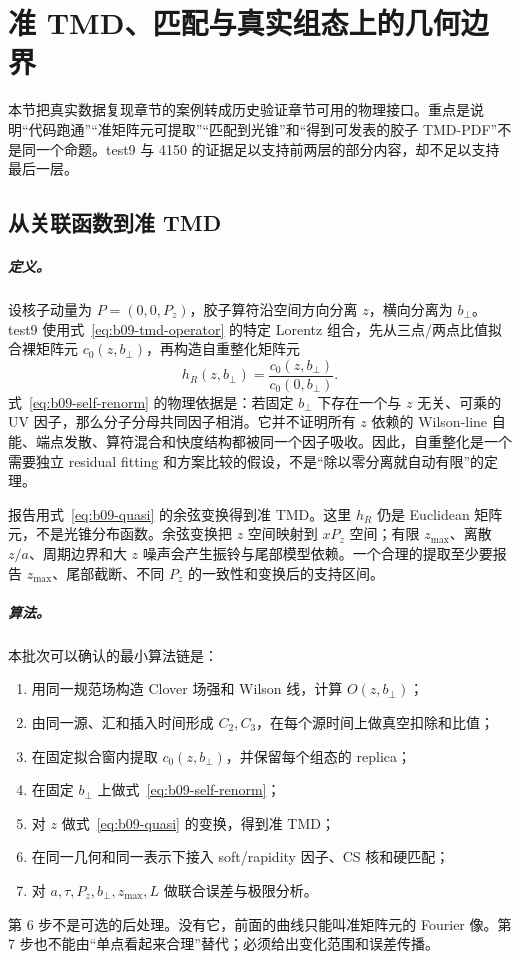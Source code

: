 \chapter{准 TMD、匹配与真实组态上的几何边界}
\label{sec:b09-quasi-to-lightcone}

本节把真实数据复现章节的案例转成历史验证章节可用的物理接口。重点是说明“代码跑通”“准矩阵元可提取”“匹配到光锥”和“得到可发表的胶子 TMD-PDF”不是同一个命题。test9 与 4150 的证据足以支持前两层的部分内容，却不足以支持最后一层。

\section{从关联函数到准 TMD}

\paragraph{定义。}
设核子动量为 \(P=(0,0,P_z)\)，胶子算符沿空间方向分离 \(z\)，横向分离为 \(b_\perp\)。test9 使用式~\eqref{eq:b09-tmd-operator} 的特定 Lorentz 组合，先从三点/两点比值拟合裸矩阵元 \(c_0(z,b_\perp)\)，再构造自重整化矩阵元
\begin{equation}
  h_R(z,b_\perp)=
  \frac{c_0(z,b_\perp)}{c_0(0,b_\perp)}.
  \label{eq:b09-self-renorm}
\end{equation}
式~\eqref{eq:b09-self-renorm} 的物理依据是：若固定 \(b_\perp\) 下存在一个与 \(z\) 无关、可乘的 UV 因子，那么分子分母共同因子相消。它并不证明所有 \(z\) 依赖的 Wilson-line 自能、端点发散、算符混合和快度结构都被同一个因子吸收。因此，自重整化是一个需要独立 residual fitting 和方案比较的假设，不是“除以零分离就自动有限”的定理。

报告用式~\eqref{eq:b09-quasi} 的余弦变换得到准 TMD。这里 \(h_R\) 仍是 Euclidean 矩阵元，不是光锥分布函数。余弦变换把 \(z\) 空间映射到 \(xP_z\) 空间；有限 \(z_{\max}\)、离散 \(z/a\)、周期边界和大 \(z\) 噪声会产生振铃与尾部模型依赖。一个合理的提取至少要报告 \(z_{\max}\)、尾部截断、不同 \(P_z\) 的一致性和变换后的支持区间。

\paragraph{算法。}
本批次可以确认的最小算法链是：
\begin{enumerate}
  \item 用同一规范场构造 Clover 场强和 Wilson 线，计算 \(O(z,b_\perp)\)；
  \item 由同一源、汇和插入时间形成 \(C_2,C_3\)，在每个源时间上做真空扣除和比值；
  \item 在固定拟合窗内提取 \(c_0(z,b_\perp)\)，并保留每个组态的 replica；
  \item 在固定 \(b_\perp\) 上做式~\eqref{eq:b09-self-renorm}；
  \item 对 \(z\) 做式~\eqref{eq:b09-quasi} 的变换，得到准 TMD；
  \item 在同一几何和同一表示下接入 soft/rapidity 因子、CS 核和硬匹配；
  \item 对 \(a,\tau,P_z,b_\perp,z_{\max},L\) 做联合误差与极限分析。
\end{enumerate}
第 6 步不是可选的后处理。没有它，前面的曲线只能叫准矩阵元的 Fourier 像。第 7 步也不能由“单点看起来合理”替代；必须给出变化范围和误差传播。

